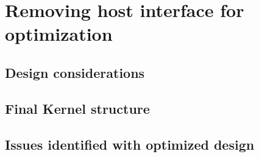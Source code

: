 \chapter{Removing host interface for optimization}
\label{cha:sys_fpgaonly}

\section{Design considerations}

\section{Final Kernel structure}

\section{Issues identified with optimized design}